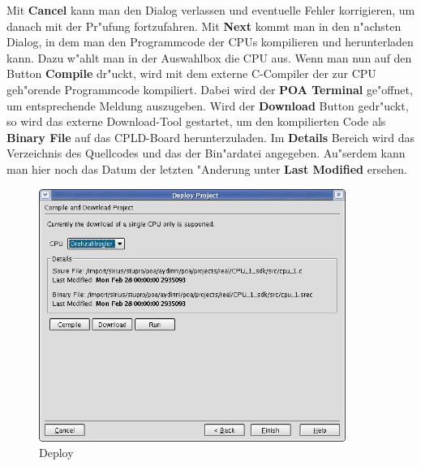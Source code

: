 \documentclass[a4paper,titlepage,12pt,ngerman]{scrbook}
\begin{document}
Mit {\bf Cancel} kann man den Dialog verlassen und eventuelle Fehler korrigieren, um danach mit der Pr"ufung fortzufahren.\newline
Mit {\bf Next} kommt man in den n"achsten Dialog, in dem man den Programmcode der CPUs kompilieren und herunterladen kann. Dazu w"ahlt man in der Auswahlbox die CPU aus. Wenn man nun auf den Button {\bf Compile} dr"uckt, wird mit dem externe C-Compiler der zur CPU geh"orende Programmcode kompiliert. Dabei wird der {\bf POA Terminal} ge"offnet, um entsprechende Meldung auszugeben. Wird der {\bf Download} Button gedr"uckt, so wird das externe Download-Tool gestartet, um den kompilierten Code als {\bf Binary File} auf das CPLD-Board herunterzuladen.
Im {\bf Details} Bereich wird das Verzeichnis des Quellcodes und das der Bin"ardatei angegeben. Au"serdem kann man hier noch das Datum der letzten "Anderung unter {\bf Last Modified} ersehen.
\begin{figure}[htbp]

\begin{center}

\includegraphics[width=10cm]{Deploy2}

\caption{Deploy}\label{test}

\end{center}
\end{figure}


\end{document}
